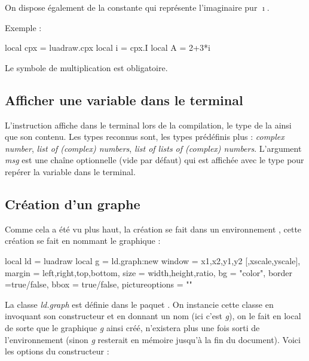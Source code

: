 On dispose également de la constante  qui représente l'imaginaire pur $\imath$. 

Exemple :

\begin{Luacode}
local cpx = luadraw.cpx
local i = cpx.I
local A = 2+3*i
\end{Luacode}

Le symbole de multiplication est obligatoire.

\subsection{Afficher une variable dans le terminal}

L'instruction  affiche dans le terminal lors de la compilation, le type de la  ainsi que son contenu. Les types reconnus sont, les types prédéfinis plus : \emph{complex number}, \emph{list of (complex) numbers}, \emph{list of lists of (complex) numbers}.  L'argument \emph{msg} est une chaîne optionnelle (vide par défaut) qui est affichée avec le type pour repérer la variable dans le terminal.

\subsection{Création d'un graphe}

Comme cela a été vu plus haut, la création se fait dans un environnement \luadrawenv, cette création se fait en nommant le graphique :

\begin{Luacode}
local ld = luadraw
local g = ld.graph:new{ window = {x1,x2,y1,y2 [,xscale,yscale]}, margin = {left,right,top,bottom}, 
                     size = {width,height,ratio}, bg = "color", border =true/false, 
                     bbox = true/false, pictureoptions = "" }
\end{Luacode}

La classe \emph{ld.graph} est définie dans le paquet \luadrawenv. On instancie cette classe en invoquant son constructeur et en donnant un nom (ici c'est \emph{g}), on le fait en local de sorte que le graphique \emph{g} ainsi créé, n'existera plus une fois sorti de l'environnement (sinon \emph{g} resterait en mémoire jusqu'à la fin du document). Voici les options du constructeur :

